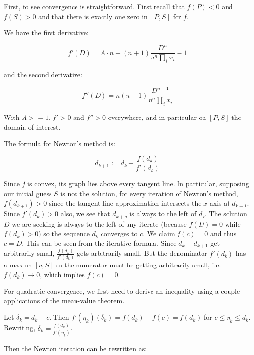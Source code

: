 \documentclass[
]{article}
\begin{document}
First, to see convergence is straightforward. First recall that
\(f(P) < 0\) and \(f(S) > 0\) and that there is exactly one zero in
\([P, S]\) for \(f\).

We have the first derivative:

\[ f'(D) = A\cdot n + (n+1) \frac{D^n}{n^n \prod_i x_i} - 1 \]

and the second derivative:

\[ f''(D) = n (n+1) \frac{D^{n-1}}{n^n \prod_i x_i} \]

With \(A >= 1\), \(f' > 0\) and \(f'' > 0\) everywhere, and in
particular on \([P, S]\) the domain of interest.

The formula for Newton's method is:

\[ d_{k+1} := d_k - \frac{f(d_k)}{f'(d_k)} \]

Since \(f\) is convex, its graph lies above every tangent line. In
particular, supposing our initial guess \(S\) is not the solution, for
every iteration of Newton's method, \(f(d_{k+1}) > 0\) since the tangent
line approximation intersects the \(x\)-axis at \(d_{k+1}\). Since
\(f'(d_k) > 0\) also, we see that \(d_{k+a}\) is always to the left of
\(d_k\). The solution \(D\) we are seeking is always to the left of any
iterate (because \(f(D) = 0\) while \(f(d_k) > 0\)) so the sequence
\(d_k\) converges to \(c\). We claim \(f(c) = 0\) and thus \(c = D\).
This can be seen from the iterative formula. Since \(d_{k} - d_{k+1}\)
get arbitrarily small, \(\frac{f(d_k)}{f'(d_k)}\) gets arbitrarily
small. But the denominator \(f'(d_k)\) has a max on \([c, S]\) so the
numerator must be getting arbitrarily small,
i.e.~\(f(d_k) \rightarrow 0\), which implies \(f(c) = 0\).

For quadratic convergence, we first need to derive an inequality using a
couple applications of the mean-value theorem.

Let \(\delta_k = d_k - c\). Then
\(f'(\eta_k) (\delta_k) = f(d_k) - f(c) = f(d_k)\) for
\(c\leq \eta_k \leq d_k\). Rewriting,
\(\delta_k = \frac{f(d_k)}{f'(\eta_k)}\).

Then the Newton iteration can be rewritten as:
\end{document}
